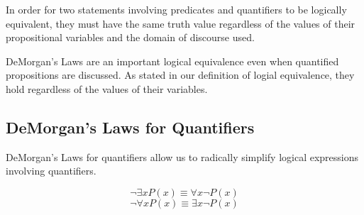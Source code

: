 In order for two statements involving predicates and quantifiers to be logically equivalent,
they must have the same truth value regardless of the values of their propositional variables
and the domain of discourse used.

DeMorgan's Laws are an important logical equivalence even when quantified propositions are discussed.
As stated in our definition of logial equivalence, they hold regardless of the values of their variables.

%
%

\subsection{DeMorgan's Laws for Quantifiers}

DeMorgan's Laws for quantifiers allow us to radically simplify logical expressions involving quantifiers.

\begin{equation}
  \neg \exists x P(x) \equiv \forall x \neg P(x)
  \label{eq:dmq1}
\end{equation}
\begin{equation}
  \neg \forall x P(x) \equiv \exists x \neg P(x)
  \label{eq:dmq2}
\end{equation}

